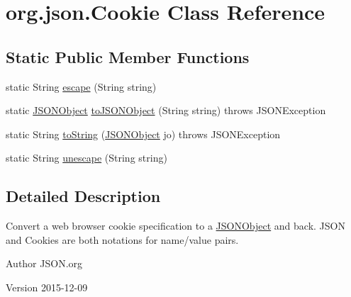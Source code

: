 \hypertarget{classorg_1_1json_1_1Cookie}{\section{org.\-json.\-Cookie Class Reference}
\label{classorg_1_1json_1_1Cookie}
}
\subsection*{Static Public Member Functions}
\begin{DoxyCompactItemize}
\item 
static String \hyperlink{classorg_1_1json_1_1Cookie_a4422021192515d995de2cef87d7836f2}{escape} (String string)
\item 
static \hyperlink{classorg_1_1json_1_1JSONObject}{J\-S\-O\-N\-Object} \hyperlink{classorg_1_1json_1_1Cookie_aaa6ae4ad2aa1db11eef24362049ce982}{to\-J\-S\-O\-N\-Object} (String string)  throws J\-S\-O\-N\-Exception 
\item 
static String \hyperlink{classorg_1_1json_1_1Cookie_a474a31a5f0b4f23d94b11c69e1d62cd1}{to\-String} (\hyperlink{classorg_1_1json_1_1JSONObject}{J\-S\-O\-N\-Object} jo)  throws J\-S\-O\-N\-Exception 
\item 
static String \hyperlink{classorg_1_1json_1_1Cookie_aea680b85e70e5a4bb34279c00b4c4bdd}{unescape} (String string)
\end{DoxyCompactItemize}


\subsection{Detailed Description}
Convert a web browser cookie specification to a \hyperlink{classorg_1_1json_1_1JSONObject}{J\-S\-O\-N\-Object} and back. J\-S\-O\-N and Cookies are both notations for name/value pairs. \begin{DoxyAuthor}{Author}
J\-S\-O\-N.\-org 
\end{DoxyAuthor}
\begin{DoxyVersion}{Version}
2015-\/12-\/09 
\end{DoxyVersion}


